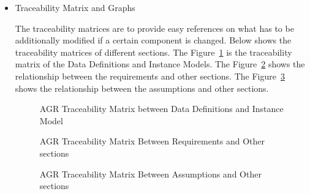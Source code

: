 \begin{itemize}
\item Traceability Matrix and Graphs

The traceability matrices are to provide easy references on what has to be additionally modified if a certain component is changed. Below shows the traceability matrices of different sections.
The Figure~\ref{fig_agr_tm_dd_im} is the traceability matrix of the Data Definitions and Instance Models. The Figure~\ref{fig_agr_tm_im_r} shows the relationship between the requirements and other sections. The Figure~\ref{fig_agr_tm_a} shows the relationship between the assumptions and other sections.
\begin{figure}[H]
    \centering
    \caption[AGR Traceability Matrix between Data Definitions and Instance Model]{AGR Traceability Matrix between Data Definitions and Instance Model}
    \label{fig_agr_tm_dd_im}
\end{figure}

\begin{figure}[H]
    \centering
    \caption[AGR Traceability Matrix Between Requirements and Other sections]{AGR Traceability Matrix Between Requirements and Other sections}
    \label{fig_agr_tm_im_r}
\end{figure}

\begin{figure}[H]
    \centering
    \caption[AGR Traceability Matrix Between Assumptions and Other sections]{AGR Traceability Matrix Between Assumptions and Other sections}
    \label{fig_agr_tm_a}
\end{figure}


\end{itemize}

